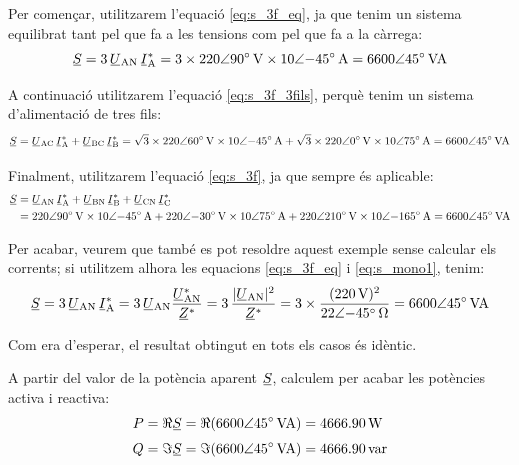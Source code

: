 \begin{exemple}[\PotSistTresFils{}]
    Per començar,  utilitzarem l'equació \eqref{eq:s_3f_eq}, ja que tenim
    un sistema equilibrat tant pel que fa a les tensions com pel que fa a la càrrega:
    \[
    \cmplx{S} = 3\,\cmplx{U}\ped{AN} \,\cmplx{I}\ped{A}^* =
    3\times \complexqty{220:90}{V} \times
    \complexqty{10:-45}{A} = \complexqty{6600:45}{VA}
    \]

    A continuació  utilitzarem l'equació \eqref{eq:s_3f_3fils}, perquè tenim
    un sistema d'alimentació de tres fils:
    \[
    \cmplx{S} = \cmplx{U}\ped{AC} \,\cmplx{I}\ped{A}^*
     +  \cmplx{U}\ped{BC} \,\cmplx{I}\ped{B}^* =
    \sqrt{3}\times \complexqty{220:60}{V} \times
    \complexqty{10:-45}{A} + \sqrt{3}\times \complexqty{220:0}{V}
    \times \complexqty{10:75}{A}  = \complexqty{6600:45}{VA}
    \]

     Finalment,  utilitzarem l'equació \eqref{eq:s_3f}, ja que
     sempre és aplicable:
     \[\begin{split}
     \cmplx{S} &=  \cmplx{U}\ped{AN} \,\cmplx{I}\ped{A}^* +
     \cmplx{U}\ped{BN} \,\cmplx{I}\ped{B}^* +  \cmplx{U}\ped{CN}\,
     \cmplx{I}\ped{C}^* \\
     &= \complexqty{220:90}{V}
     \times \complexqty{10:-45}{A} + \complexqty{220:-30}{V} \times \complexqty{10:75}{A}
     + \complexqty{220:210}{V} \times \complexqty{10:-165}{A} = \complexqty{6600:45}{VA}
     \end{split} \]

    Per acabar, veurem que també es pot resoldre aquest exemple
    sense calcular els corrents; si utilitzem alhora les
    equacions \eqref{eq:s_3f_eq} i \eqref{eq:s_mono1}, tenim:
    \[
    \cmplx{S} = 3\,\cmplx{U}\ped{AN} \,\cmplx{I}\ped{A}^* =
    3\,\cmplx{U}\ped{AN}\frac{\cmplx{U}\ped{AN}^*}{\cmplx{Z}^*} =
    3\, \frac{|\cmplx{U}\ped{AN}|^2}{\cmplx{Z}^*} =
    3 \times \frac{(\qty{220}{V})^2}{\complexqty{22:-45}{\ohm}} =
    \complexqty{6600:45}{VA}
    \]

    Com era d'esperar, el resultat obtingut en tots els casos
    és idèntic.

    A partir del valor de la potència aparent $\cmplx{S}$, calculem per acabar les potències activa i reactiva:
    \begin{align*}
        P &= \Re\cmplx{S} = \Re(\complexqty{6600:45}{VA}) = \qty{4666,90}{W} \\[1mm]
        Q &= \Im\cmplx{S} = \Im(\complexqty{6600:45}{VA}) = \qty{4666,90}{var}
    \end{align*}

\end{exemple}

